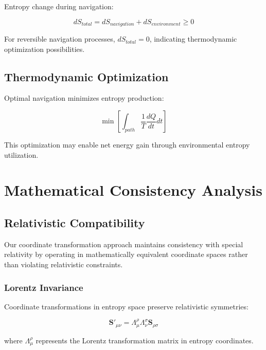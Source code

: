 \documentclass[12pt,a4paper]{article}
\begin{document}
Entropy change during navigation:

\begin{equation}
dS_{total} = dS_{navigation} + dS_{environment} \geq 0
\label{eq:second_law_entropy}
\end{equation}

For reversible navigation processes, $dS_{total} = 0$, indicating thermodynamic optimization possibilities.

\subsection{Thermodynamic Optimization}

Optimal navigation minimizes entropy production:

\begin{equation}
\min \left[ \int_{path} \frac{1}{T} \frac{dQ}{dt} dt \right]
\label{eq:optimization}
\end{equation}

This optimization may enable net energy gain through environmental entropy utilization.

\section{Mathematical Consistency Analysis}

\subsection{Relativistic Compatibility}

Our coordinate transformation approach maintains consistency with special relativity by operating in mathematically equivalent coordinate spaces rather than violating relativistic constraints.

\subsubsection{Lorentz Invariance}

Coordinate transformations in entropy space preserve relativistic symmetries:

\begin{equation}
\mathbf{S}'_{\mu\nu} = \Lambda^{\rho}_{\mu} \Lambda^{\sigma}_{\nu} \mathbf{S}_{\rho\sigma}
\label{eq:lorentz_invariant}
\end{equation}

where $\Lambda^{\rho}_{\mu}$ represents the Lorentz transformation matrix in entropy coordinates.
\end{document}
